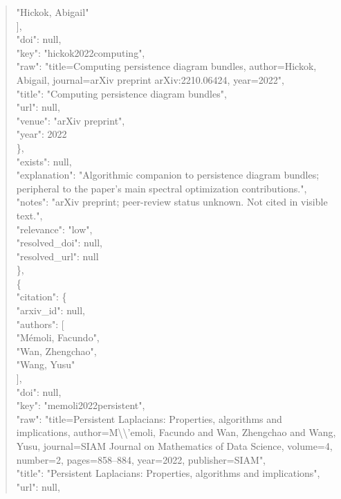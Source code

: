 \documentclass[11pt]{article}
\begin{document}
\begin{quote}
          "Hickok, Abigail"\\
        ],\\
        "doi": null,\\
        "key": "hickok2022computing",\\
        "raw": "title=Computing persistence diagram bundles, author=Hickok, Abigail, journal=arXiv preprint arXiv:2210.06424, year=2022",\\
        "title": "Computing persistence diagram bundles",\\
        "url": null,\\
        "venue": "arXiv preprint",\\
        "year": 2022\\
      \},\\
      "exists": null,\\
      "explanation": "Algorithmic companion to persistence diagram bundles; peripheral to the paper's main spectral optimization contributions.",\\
      "notes": "arXiv preprint; peer-review status unknown. Not cited in visible text.",\\
      "relevance": "low",\\
      "resolved\_doi": null,\\
      "resolved\_url": null\\
    \},\\
    \{\\
      "citation": \{\\
        "arxiv\_id": null,\\
        "authors": [\\
          "Mémoli, Facundo",\\
          "Wan, Zhengchao",\\
          "Wang, Yusu"\\
        ],\\
        "doi": null,\\
        "key": "memoli2022persistent",\\
        "raw": "title=Persistent Laplacians: Properties, algorithms and implications, author=M\textbackslash{}\textbackslash{}'emoli, Facundo and Wan, Zhengchao and Wang, Yusu, journal=SIAM Journal on Mathematics of Data Science, volume=4, number=2, pages=858--884, year=2022, publisher=SIAM",\\
        "title": "Persistent Laplacians: Properties, algorithms and implications",\\
        "url": null,\\

\end{quote}
\end{document}
